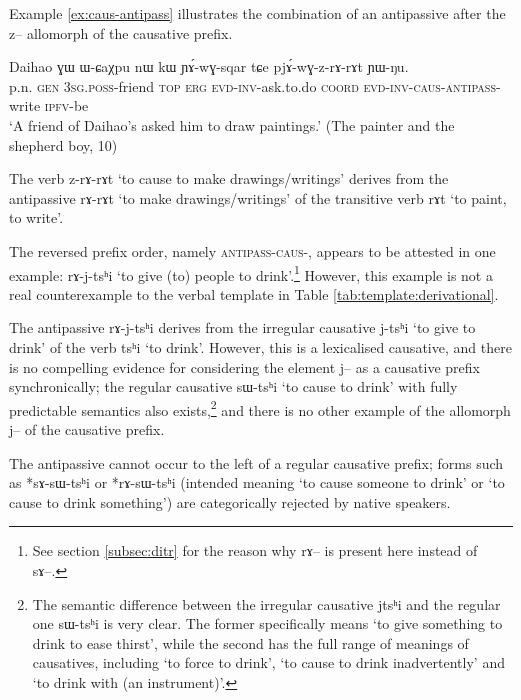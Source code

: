 \documentclass[oldfontcommands,oneside,a4paper,11pt]{article}
\newcommand{\ipa}[1]{{\phon \mbox{#1}}} %
\begin{document}
Example \ref{ex:caus-antipass} illustrates the combination of an antipassive after the \ipa{z--} allomorph of the causative prefix.

\begin{exe}
\ex \label{ex:caus-antipass}
\gll  Daihao 	\ipa{ɣɯ} 	\ipa{ɯ-ɕaχpu} 	\ipa{nɯ} 	\ipa{kɯ} 	\ipa{ɲɤ́-wɣ-sqar} 	\ipa{tɕe}  \ipa{pjɤ́-wɣ-z-rɤ-rɤt} 	\ipa{ɲɯ-ŋu.}   \\
  p.n. \textsc{gen} 3\textsc{sg.poss}-friend \textsc{top} \textsc{erg} \textsc{evd-inv}-ask.to.do \textsc{coord} \textsc{evd-inv-caus-antipass}-write \textsc{ipfv}-be  \\
 \glt `A friend of Daihao's asked him to draw paintings.'  (The painter and the shepherd boy, 10)
\end{exe} 

The verb \ipa{z-rɤ-rɤt} `to cause to make drawings/writings' derives from the antipassive \ipa{rɤ-rɤt} `to make drawings/writings' of the transitive verb \ipa{rɤt} `to paint, to write'.

The reversed prefix order, namely \textsc{antipass}-\textsc{caus}-, appears to be attested in one example:  \ipa{rɤ-j-tsʰi} `to give (to) people to drink'.\footnote{See section \ref{subsec:ditr} for the reason why \ipa{rɤ}-- is present here instead of \ipa{sɤ}--.} However, this example is not a real counterexample to the verbal template in Table \ref{tab:template:derivational}.

The antipassive  \ipa{rɤ-j-tsʰi} derives from the irregular causative \ipa{j-tsʰi} `to give to drink' of the verb \ipa{tsʰi} `to drink'.  However, this is a lexicalised causative, and there is no compelling evidence for considering the element \ipa{j--} as a causative prefix synchronically;  the regular causative \ipa{sɯ-tsʰi} `to cause  to drink' with fully predictable semantics also exists,\footnote{The semantic difference between the irregular causative  \ipa{jtsʰi} and the regular one \ipa{sɯ-tsʰi} is very clear. The former specifically means `to give something to drink to ease thirst', while the second has the full range of meanings of causatives, including `to force to drink', `to cause to drink inadvertently' and `to drink with (an instrument)'. } and there is no other example of the allomorph \ipa{j}-- of the causative prefix.

The antipassive cannot occur to the left of a regular causative prefix; forms such as *\ipa{sɤ-sɯ-tsʰi} or *\ipa{rɤ-sɯ-tsʰi} (intended meaning `to cause someone to drink' or `to cause  to drink something') are categorically rejected by native speakers.
\end{document}
